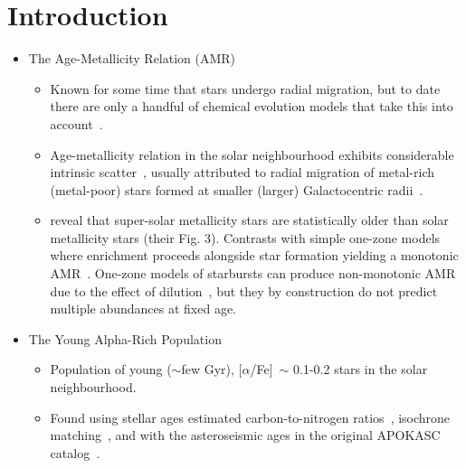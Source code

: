 \documentclass[a4paper, fleqn, usenatbib, useAMS]{mnras}
\begin{document}
\section{Introduction} 
\label{sec:intro} 
\begin{itemize} 
	\item The Age-Metallicity Relation (AMR) 
	\begin{itemize} 

		\item Known for some time that stars undergo radial migration, 
		but to date there are only a handful of chemical evolution models that 
		take this into account~\citep{Wielen1996, Edvardsson1993, Sellwood2002, 
		Schoenrich2009, Minchev2013, Minchev2014, Minchev2017, Sharma2020}. 

		\item Age-metallicity relation in the solar neighbourhood exhibits 
		considerable intrinsic scatter~\citep{Edvardsson1993}, usually 
		attributed to radial migration of metal-rich (metal-poor) stars formed 
		at smaller (larger) Galactocentric radii~\citep{Sellwood2002, 
		Haywood2008, Roskar2008b, Schoenrich2009}. 

		\item \citet{Feuillet2018} reveal that super-solar metallicity stars 
		are statistically older than solar metallicity stars (their Fig. 3). 
		Contrasts with simple one-zone models where enrichment proceeds 
		alongside star formation yielding a monotonic 
		AMR~\citep[e.g.][]{Andrews2017, Weinberg2017}. One-zone models of 
		starbursts can produce non-monotonic AMR due to the effect of 
		dilution~\citep{Johnson2020}, but they by construction do not predict 
		multiple abundances at fixed age. 
	\end{itemize}

	\item The Young Alpha-Rich Population 
	\begin{itemize} 
		\item Population of young ($\sim$few Gyr), [$\alpha$/Fe]~$\sim$ 
		0.1-0.2 stars in the solar neighbourhood. 

		\item Found using stellar ages estimated carbon-to-nitrogen 
		ratios~\citep{Martig2016}, isochrone matching~\citep{Feuillet2018, 
		Feuillet2019}, and with the asteroseismic ages in the original APOKASC 
		catalog~\citep{SilvaAguirre2018, Pinsonneault2014}. 


\end{itemize}
\end{itemize}
\end{document}
